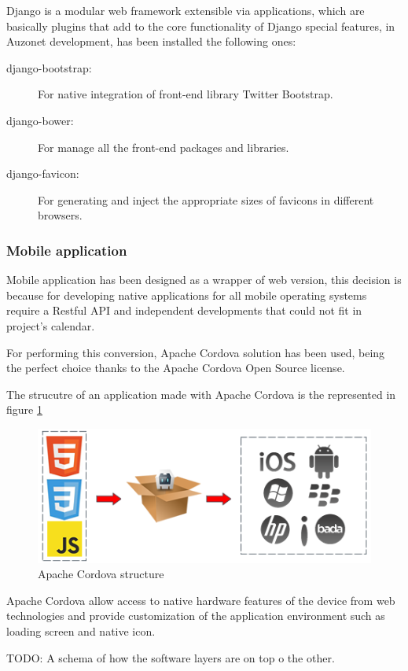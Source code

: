 \documentclass{DeustoFDP}
\begin{document}
Django is a modular web framework extensible via applications, which are basically plugins that add to the core functionality of Django special features, in Auzonet development, has been installed the following ones:

\begin{description}
	\item[django-bootstrap:] For native integration of front-end library Twitter Bootstrap.
	\item[django-bower:] For manage all the front-end packages and libraries.
	\item[django-favicon:] For generating and inject the appropriate sizes of favicons in different browsers. 
\end{description}

\subsubsection{Mobile application}
Mobile application has been designed as a wrapper of web version, this decision is because for developing native applications for all mobile operating systems require a Restful API and independent developments that could not fit in project's calendar.

For performing this conversion, Apache Cordova solution has been used, being the perfect choice thanks to the Apache Cordova Open Source license.

The strucutre of an application made with Apache Cordova is the represented in figure \ref{fig:cordova_workflow}

\begin{figure}[h]
\centering
\includegraphics[width=0.7\linewidth]{fig/cordova_workflow}
\caption[Apache Cordova structure]{Apache Cordova structure}
\label{fig:cordova_workflow}
\end{figure}

Apache Cordova allow access to native hardware features of the device from web technologies and provide customization of the application environment such as loading screen and native icon.

TODO: A schema of how the software layers are on top o the other.
\end{document}
